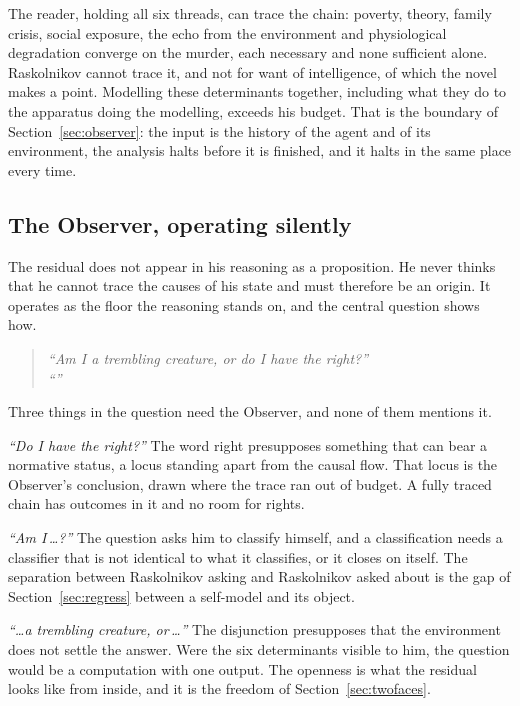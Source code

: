 The reader, holding all six threads, can trace the chain: poverty, theory, family crisis, social
exposure, the echo from the environment and physiological degradation converge on the murder, each
necessary and none sufficient alone. Raskolnikov cannot trace it, and not for want of intelligence,
of which the novel makes a point. Modelling these determinants together, including what they do to the
apparatus doing the modelling, exceeds his budget. That is the boundary of
Section~\ref{sec:observer}: the input is the history of the agent and of its environment, the analysis
halts before it is finished, and it halts in the same place every time.

\subsection*{The Observer, operating silently}

The residual does not appear in his reasoning as a proposition. He never thinks that he cannot trace the
causes of his state and must therefore be an origin. It operates as the floor the reasoning stands on,
and the central question shows how.

\begin{quote}
\emph{``Am I a trembling creature, or do I have the right?''}\\
\emph{``''}
\end{quote}

Three things in the question need the Observer, and none of them mentions it.

\emph{``Do I have the right?''} The word right presupposes something that can bear a normative status, a
locus standing apart from the causal flow. That locus is the Observer's conclusion, drawn where the
trace ran out of budget. A fully traced chain has outcomes in it and no room for rights.

\emph{``Am I\,\ldots?''} The question asks him to classify himself, and a classification needs a
classifier that is not identical to what it classifies, or it closes on itself. The separation between
Raskolnikov asking and Raskolnikov asked about is the gap of Section~\ref{sec:regress} between a
self-model and its object.

\emph{``\ldots a trembling creature, or\,\ldots''} The disjunction presupposes that the environment does
not settle the answer. Were the six determinants visible to him, the question would be a computation
with one output. The openness is what the residual looks like from inside, and it is the freedom of
Section~\ref{sec:twofaces}.

